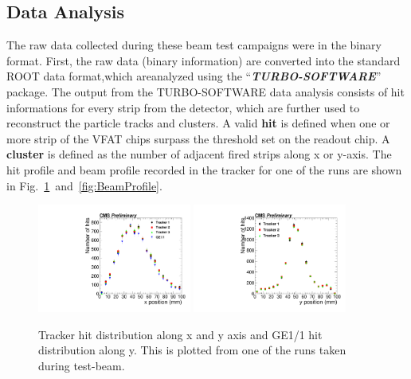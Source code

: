 \subsection{Data Analysis} %
\label{sub:test_beam_analysis}
The raw data collected during these beam test campaigns were in the binary format.
First, the raw data (binary information) are converted into the standard ROOT data format,which areanalyzed using the ``\textit{\textbf{TURBO-SOFTWARE}}''~\cite{git-trubosoftware} package.
The output from the TURBO-SOFTWARE data analysis consists of hit informations for every strip from the detector, which are further used to reconstruct the particle tracks and clusters.
A valid \textbf{hit} is defined when one or more strip of the VFAT chips surpass the threshold set on the readout chip.
A \textbf{cluster} is defined as the number of adjacent fired strips along x or y-axis.
The hit profile and beam profile recorded in the tracker for one of the runs are shown in Fig.~\ref{fig:HitPosXaxis}~and~\ref{fig:BeamProfile}.
\begin{figure}[!htbp]
\centering
\includegraphics[width=0.45\textwidth]{figures/GEM/Tracker_Hit_position_Run1644_x.pdf}%
\includegraphics[width=0.45\textwidth]{figures/GEM/Tracker_Hit_position_Run1644_y.pdf}
\caption{Tracker hit distribution along x and y axis and GE1/1 hit distribution along y. This is plotted from one of the runs taken during test-beam.}
\label{fig:HitPosXaxis}
\end{figure}
